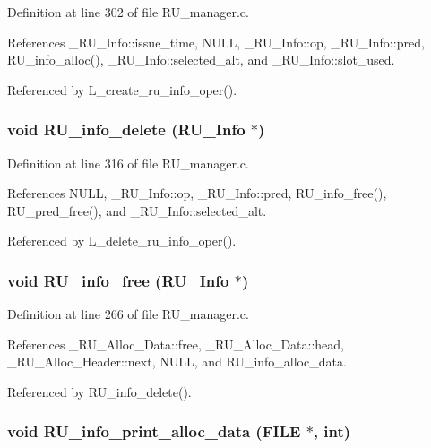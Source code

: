 Definition at line 302 of file RU\_\-manager.c.

References \_\-RU\_\-Info::issue\_\-time, NULL, \_\-RU\_\-Info::op, \_\-RU\_\-Info::pred, RU\_\-info\_\-alloc(), \_\-RU\_\-Info::selected\_\-alt, and \_\-RU\_\-Info::slot\_\-used.

Referenced by L\_\-create\_\-ru\_\-info\_\-oper().
\subsubsection{\setlength{\rightskip}{0pt plus 5cm}void RU\_\-info\_\-delete (\bf{RU\_\-Info} $\ast$)}\label{RU__manager_8h_93d939f38cbf8214dc9d6ae068f27e74}




Definition at line 316 of file RU\_\-manager.c.

References NULL, \_\-RU\_\-Info::op, \_\-RU\_\-Info::pred, RU\_\-info\_\-free(), RU\_\-pred\_\-free(), and \_\-RU\_\-Info::selected\_\-alt.

Referenced by L\_\-delete\_\-ru\_\-info\_\-oper().
\subsubsection{\setlength{\rightskip}{0pt plus 5cm}void RU\_\-info\_\-free (\bf{RU\_\-Info} $\ast$)}\label{RU__manager_8h_ba967b537368eef6402320c889fa18f6}




Definition at line 266 of file RU\_\-manager.c.

References \_\-RU\_\-Alloc\_\-Data::free, \_\-RU\_\-Alloc\_\-Data::head, \_\-RU\_\-Alloc\_\-Header::next, NULL, and RU\_\-info\_\-alloc\_\-data.

Referenced by RU\_\-info\_\-delete().
\subsubsection{\setlength{\rightskip}{0pt plus 5cm}void RU\_\-info\_\-print\_\-alloc\_\-data (FILE $\ast$, int)}\label{RU__manager_8h_ffb4e8c5bb93b902e6a9c40ec3056e4f}




